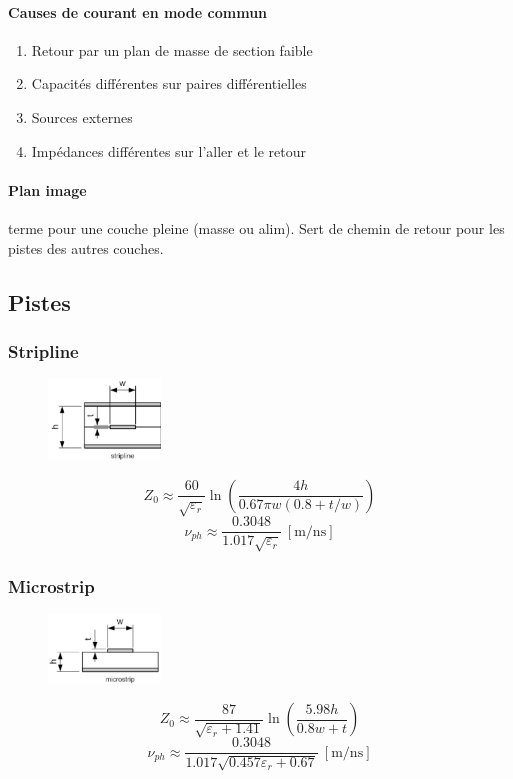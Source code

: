 \documentclass[resume]{subfiles}
\begin{document}
\begin{multicols}{3}
\paragraph{Causes de courant en mode commun}
\begin{enumerate}
\item Retour par un plan de masse de section faible
\item Capacités différentes sur paires différentielles
\item Sources externes
\item Impédances différentes sur l'aller et le retour
\end{enumerate}
\paragraph{Plan image} terme pour une couche pleine (masse ou alim). Sert de chemin de retour pour les pistes des autres couches. 
\subsection{Pistes}
\subsubsection{Stripline}
\begin{figure}[H]
\centering
\includegraphics[width=3.00cm]{img_15.png}
\end{figure}
$$Z_0\approx\frac{60}{\sqrt{\varepsilon_r}}\ln\left(\frac{4h}{0.67\pi w\left(0.8+t/w\right)}\right)$$
$$\nu_{ph}\approx\frac{0.3048}{1.017\sqrt{\varepsilon_r}}\ [\si{\meter\per\nano\second}]$$
\subsubsection{Microstrip}
\begin{figure}[H]
\centering
\includegraphics[width=3.00cm]{img_16.png}
\end{figure}
$$Z_0\approx \frac{87}{\sqrt{\varepsilon_r+1.41}}\ln\left(\frac{5.98h}{0.8w+t}\right)$$
$$\nu_{ph}\approx\frac{0.3048}{1.017\sqrt{0.457\varepsilon_r+0.67}}\ [\si{\meter\per\nano\second}]$$


\end{multicols}
\end{document}
